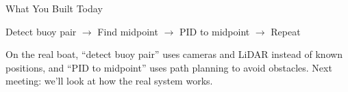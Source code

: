 \documentclass[aspectratio=169]{beamer}
\begin{document}
\begin{frame}{What You Built Today}
    \begin{center}
        \Large
        Detect buoy pair $\rightarrow$ Find midpoint $\rightarrow$ PID to midpoint $\rightarrow$ Repeat
    \end{center}
    \vfill
    On the real boat, ``detect buoy pair'' uses cameras and LiDAR instead of known positions, and ``PID to midpoint'' uses path planning to avoid obstacles.
    \vfill
    Next meeting: we'll look at how the real system works.
\end{frame}
\end{document}
